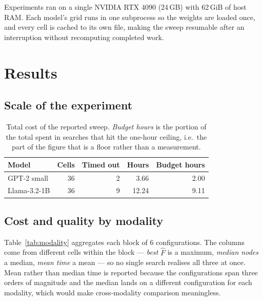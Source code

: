 \documentclass[11pt,a4paper]{article}
\begin{document}
Experiments ran on a single NVIDIA RTX 4090 (24\,GB) with 62\,GiB of host RAM. Each model's
grid runs in one subprocess so the weights are loaded once, and every cell is cached to its own
file, making the sweep resumable after an interruption without recomputing completed work.

\section{Results}

\subsection{Scale of the experiment}

\begin{table}[h]
\centering
\caption{Total cost of the reported sweep. \emph{Budget hours} is the portion of the total
spent in searches that hit the one-hour ceiling, i.e.\ the part of the figure that is a floor
rather than a measurement.}
\label{tab:scale}
\begin{tabular}{lrrrr}
\toprule
Model & Cells & Timed out & Hours & Budget hours \\
\midrule
GPT-2 small & 36 & 2 & 3.66 & 2.00 \\
Llama-3.2-1B & 36 & 9 & 12.24 & 9.11 \\
\bottomrule
\end{tabular}
\end{table}

\subsection{Cost and quality by modality}

Table~\ref{tab:modality} aggregates each block of 6 configurations. The columns come from
different cells within the block --- \emph{best} $\widehat{F}$ is a maximum, \emph{median nodes}
a median, \emph{mean time} a mean --- so no single search realises all three at once. Mean
rather than median time is reported because the configurations span three orders of magnitude
and the median lands on a different configuration for each modality, which would make
cross-modality comparison meaningless.
\end{document}
